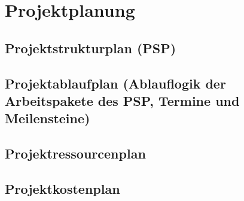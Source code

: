 
\section{Projektplanung}


\subsection{Projektstrukturplan (PSP)}

\subsection{Projektablaufplan (Ablauflogik der Arbeitspakete des PSP, Termine und Meilensteine)}

\subsection{Projektressourcenplan}

\subsection{Projektkostenplan}